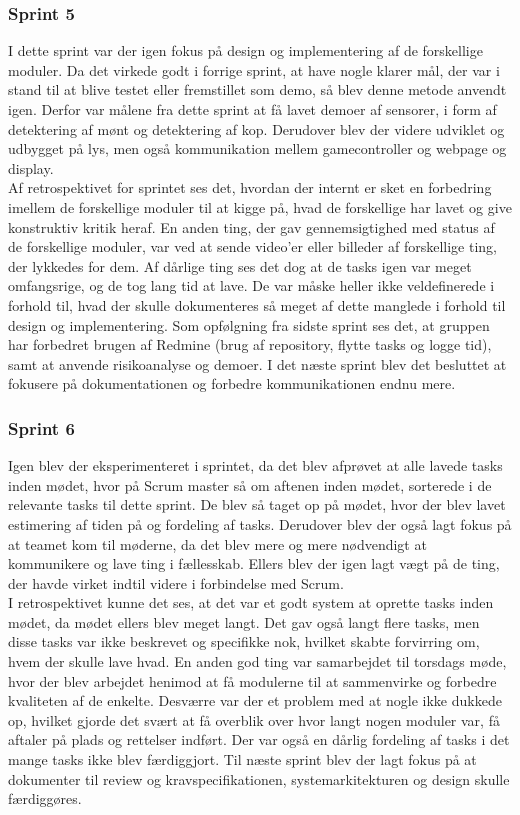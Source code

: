 \documentclass[a4paper,12pt,fleqn,oneside]{article}
\begin{document}
\subsubsection{Sprint 5}
I dette sprint var der igen fokus på design og implementering af de forskellige moduler. Da det virkede godt i forrige sprint, at have nogle klarer mål, der var i stand til at blive testet eller fremstillet som demo, så blev denne metode anvendt igen. Derfor var målene fra dette sprint at få lavet demoer af sensorer, i form af detektering af mønt og detektering af kop. Derudover blev der videre udviklet og udbygget på lys, men også kommunikation mellem gamecontroller og webpage og display.
\\Af retrospektivet for sprintet ses det, hvordan der internt er sket en forbedring imellem de forskellige moduler til at kigge på, hvad de forskellige har lavet og give konstruktiv kritik heraf. En anden ting, der gav gennemsigtighed med status af de forskellige moduler, var ved at sende video'er eller billeder af forskellige ting, der lykkedes for dem. Af dårlige ting ses det dog at de tasks igen var meget omfangsrige, og de tog lang tid at lave. De var måske heller ikke veldefinerede i forhold til, hvad der skulle dokumenteres så meget af dette manglede i forhold til design og implementering. Som opfølgning fra sidste sprint ses det, at gruppen har forbedret brugen af Redmine (brug af repository, flytte tasks og logge tid), samt at anvende risikoanalyse og demoer. I det næste sprint blev det besluttet at fokusere på dokumentationen og forbedre kommunikationen endnu mere.

\subsubsection{Sprint 6}
Igen blev der eksperimenteret i sprintet, da det blev afprøvet at alle lavede tasks inden mødet, hvor på Scrum master så om aftenen inden mødet, sorterede i de  relevante tasks til dette sprint. De blev så taget op på mødet, hvor der blev lavet estimering af tiden på og fordeling af tasks. Derudover blev der også lagt fokus på at teamet kom til møderne, da det blev mere og mere nødvendigt at kommunikere og lave ting i fællesskab. Ellers blev der igen lagt vægt på de ting, der havde virket indtil videre i forbindelse med Scrum.
\\I retrospektivet kunne det ses, at det var et godt system at oprette tasks inden mødet, da mødet ellers blev meget langt. Det gav også langt flere tasks, men disse tasks var ikke beskrevet og specifikke nok, hvilket skabte forvirring om, hvem der skulle lave hvad. En anden god ting var samarbejdet til torsdags møde, hvor der blev arbejdet henimod at få modulerne til at sammenvirke og forbedre kvaliteten af de enkelte. Desværre var der et problem med at nogle ikke dukkede op, hvilket gjorde det svært at få overblik over hvor langt nogen moduler var, få aftaler på plads og rettelser indført. Der var også en dårlig fordeling af tasks i det mange tasks ikke blev færdiggjort. Til næste sprint blev der lagt fokus på at dokumenter til review og kravspecifikationen, systemarkitekturen og design skulle færdiggøres. 
\end{document}

